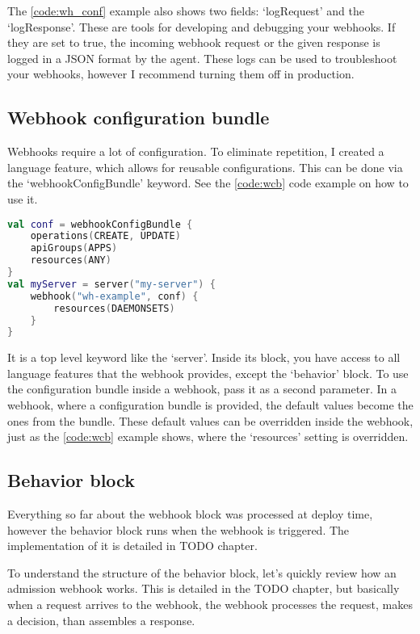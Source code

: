 The \ref{code:wh_conf} example also shows two fields: `logRequest' and the `logResponse'. These are tools for developing and debugging your webhooks. If they are set to true, the incoming webhook request or the given response is logged in a JSON format by the agent. These logs can be used to troubleshoot your webhooks, however I recommend turning them off in production.

\subsection{Webhook configuration bundle}

Webhooks require a lot of configuration. To eliminate repetition, I created a language feature, which allows for reusable configurations. This can be done via the `webhookConfigBundle' keyword. See the \ref{code:wcb} code example on how to use it.

\begin{lstlisting}[caption={Webhook configuration bundle},language=Kotlin,label=code:wcb]
val conf = webhookConfigBundle {
    operations(CREATE, UPDATE)
    apiGroups(APPS)
    resources(ANY)
}
val myServer = server("my-server") {
    webhook("wh-example", conf) {
        resources(DAEMONSETS)
    }
}
\end{lstlisting}

It is a top level keyword like the `server'. Inside its block, you have access to all language features that the webhook provides, except the `behavior' block. To use the configuration bundle inside a webhook, pass it as a second parameter. In a webhook, where a configuration bundle is provided, the default values become the ones from the bundle. These default values can be overridden inside the webhook, just as the \ref{code:wcb} example shows, where the `resources' setting is overridden.

\subsection{Behavior block}

Everything so far about the webhook block was processed at deploy time, however the behavior block runs when the webhook is triggered. The implementation of it is detailed in TODO chapter. 

To understand the structure of the behavior block, let's quickly review how an admission webhook works. This is detailed in the TODO chapter, but basically when a request arrives to the webhook, the webhook processes the request, makes a decision, than assembles a response.

